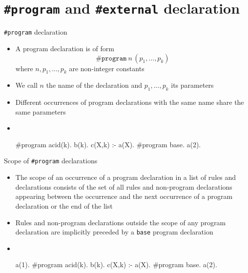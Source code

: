 \section{\texttt{\#program} and \texttt{\#external} declaration}
\begin{frame}[fragile]{\texttt{\#program} declaration}
  \begin{itemize}
  \item A \alert{program declaration} is of form
    \[
    \texttt{\#program}~n\,(p_1,\dots,p_k)
    \]
    where $n,p_1,\dots,p_k$ are non-integer constants
  \item <2-> We call $n$ the \alert<2>{name} of the declaration and $p_1,\dots,p_k$ its \alert<2>{parameters}
    \smallskip
  \item <3-> 
    Different occurrences of program declarations with the same name share the same parameters
    \smallskip
  \item <5->  \
    \begin{minipage}[t]{0.5\linewidth}
      \begin{semiverbatim}
        #program \alert<5>{acid(k)}.
        b(k).
        c(X,k) :- a(X).
        #program \alert<5>{base}.
        a(2).
      \end{semiverbatim}
    \end{minipage}
  \end{itemize}
\end{frame}
\begin{frame}[fragile]{Scope of \texttt{\#program} declarations}
  \begin{itemize}
  \item <1->
    The \alert{scope} of an occurrence of a program declaration in a list of rules and declarations
    consists of the set of all rules and non-program declarations appearing between
    the occurrence and the next occurrence of a program declaration or the end of the list
  \item <2->
    Rules and non-program declarations outside the scope of any program declaration
    are implicitly preceded by a \alert<2>{\lstinline{base}} program declaration
    \medskip
  \item <3->  \
    \begin{minipage}[t]{0.5\linewidth}
      \begin{semiverbatim}
        \alert<5>{a(1).}
        #program \alert<4>{acid(k)}.
        \alert<4>{b(k).}
        \alert<4>{c(X,k) :- a(X).}
        #program \alert<5>{base}.
        \alert<5>{a(2).}
      \end{semiverbatim}
    \end{minipage}
  \end{itemize}
\end{frame}
